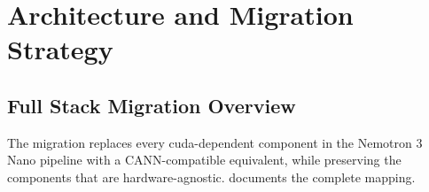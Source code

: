 
\section{Architecture and Migration Strategy}
\label{sec:architecture-strategy}

\subsection{Full Stack Migration Overview}
\label{subsec:stack-overview}

The migration replaces every \acrshort{cuda}-dependent component in
the Nemotron 3 Nano pipeline with a CANN-compatible equivalent,
while preserving the components that are hardware-agnostic. 
documents the complete mapping.


